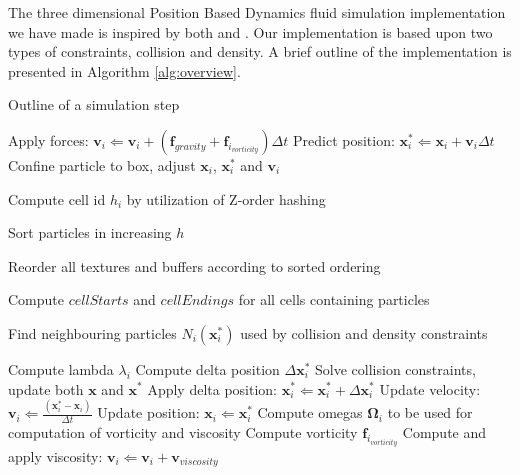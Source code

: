 The three dimensional Position Based Dynamics fluid simulation implementation
we have made is inspired by both \cite{macklin2013position} and
\cite{macklin2014unified}. Our implementation is based upon two types of
constraints, collision and density. A brief outline of the implementation is
presented in Algorithm \ref{alg:overview}.

\begin{algorithm}
\caption{Outline of a simulation step}
\label{alg:overview}
\begin{algorithmic}[1]
\small

\State Apply forces: $\mathbf{v}_{i} \Leftarrow \mathbf{v}_{i} + (\mathbf{f}_{gravity} + \mathbf{f}_{i_{vorticity}})\Delta t$
\State Predict position: $\mathbf{x}_{i}^{*} \Leftarrow \mathbf{x}_{i} + \mathbf{v}_{i} \Delta t$
\State Confine particle to box, adjust $\mathbf{x}_{i}$, $\mathbf{x}_{i}^{*}$ and $\mathbf{v}_{i}$
\EndFor


\State Compute cell id $h_{i}$ by utilization of Z-order hashing
\EndFor

\State Sort particles in increasing $h$

\State Reorder all textures and buffers according to sorted ordering

\State Compute $cellStarts$ and $cellEndings$ for all cells containing particles


\State Find neighbouring particles $N_{i}(\mathbf{x}_{i}^{*})$ used by collision and density constraints
\EndFor

\State Compute lambda $\lambda_{i}$
\EndFor
{}
\State Compute delta position $\Delta \mathbf{x}_{i}^{*}$
\EndFor
{}
\State Solve collision constraints, update both $\mathbf{x}$ and $\mathbf{x}^{*}$
\EndWhile
{}
\State Apply delta position: $\mathbf{x}_{i}^{*} \Leftarrow \mathbf{x}_{i}^{*} + \Delta \mathbf{x}_{i}^{*}$
\EndFor
\EndWhile
{}
\State Update velocity: $\mathbf{v}_{i} \Leftarrow \frac{(\mathbf{x}_{i}^{*} - \mathbf{x}_{i})}{\Delta t}$
\State Update position: $\mathbf{x}_{i} \Leftarrow \mathbf{x}_{i}^{*}$
\EndFor
{}
\State Compute omegas $\mathbf{\Omega}_{i}$ to be used for computation of vorticity and viscosity
\EndFor
{}
\State Compute vorticity $\mathbf{f}_{i_{vorticity}}$
\EndFor
{}
\State Compute and apply viscosity: $\mathbf{v}_{i} \Leftarrow \mathbf{v}_{i} + \mathbf{v}_{viscosity}$
\EndFor

\end{algorithmic}
\end{algorithm}

